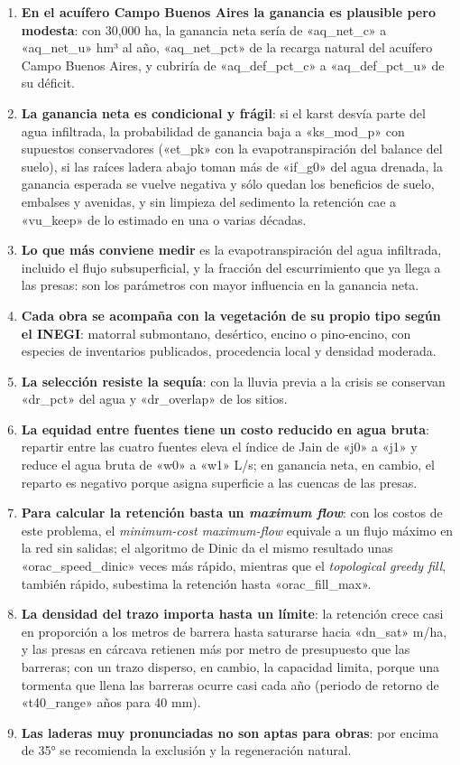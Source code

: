 \begin{enumerate}
  \item \textbf{En el acuífero Campo Buenos Aires la ganancia es plausible pero modesta}: con 30,000 ha, la ganancia neta sería de «aq_net_c» a «aq_net_u» hm³ al año, «aq_net_pct» de la recarga natural del acuífero Campo Buenos Aires, y cubriría de «aq_def_pct_c» a «aq_def_pct_u» de su déficit.
  \item \textbf{La ganancia neta es condicional y frágil}: si el karst desvía parte del agua infiltrada, la probabilidad de ganancia baja a «ks_mod_p» con supuestos conservadores («et_pk» con la evapotranspiración del balance del suelo), si las raíces ladera abajo toman más de «if_g0» del agua drenada, la ganancia esperada se vuelve negativa y sólo quedan los beneficios de suelo, embalses y avenidas, y sin limpieza del sedimento la retención cae a «vu_keep» de lo estimado en una o varias décadas.
  \item \textbf{Lo que más conviene medir} es la evapotranspiración del agua infiltrada, incluido el flujo subsuperficial, y la fracción del escurrimiento que ya llega a las presas: son los parámetros con mayor influencia en la ganancia neta.
  \item \textbf{Cada obra se acompaña con la vegetación de su propio tipo según el INEGI}: matorral submontano, desértico, encino o pino-encino, con especies de inventarios publicados, procedencia local y densidad moderada.
  \item \textbf{La selección resiste la sequía}: con la lluvia previa a la crisis se conservan «dr_pct» del agua y «dr_overlap» de los sitios.
  \item \textbf{La equidad entre fuentes tiene un costo reducido en agua bruta}: repartir entre las cuatro fuentes eleva el índice de Jain de «j0» a «j1» y reduce el agua bruta de «w0» a «w1» L/s; en ganancia neta, en cambio, el reparto es negativo porque asigna superficie a las cuencas de las presas.
  \item \textbf{Para calcular la retención basta un \emph{maximum flow}}: con los costos de este problema, el \emph{minimum-cost maximum-flow} equivale a un flujo máximo en la red sin salidas; el algoritmo de Dinic da el mismo resultado unas «orac_speed_dinic» veces más rápido, mientras que el \emph{topological greedy fill}, también rápido, subestima la retención hasta «orac_fill_max».
  \item \textbf{La densidad del trazo importa hasta un límite}: la retención crece casi en proporción a los metros de barrera hasta saturarse hacia «dn_sat» m/ha, y las presas en cárcava retienen más por metro de presupuesto que las barreras; con un trazo disperso, en cambio, la capacidad limita, porque una tormenta que llena las barreras ocurre casi cada año (periodo de retorno de «t40_range» años para 40 mm).
  \item \textbf{Las laderas muy pronunciadas no son aptas para obras}: por encima de 35° se recomienda la exclusión y la regeneración natural.
\end{enumerate}

